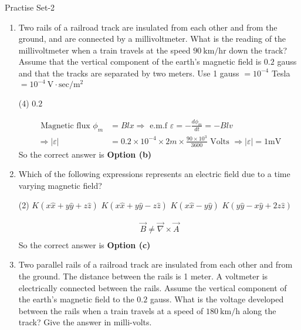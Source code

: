 \newpage
\begin{abox}
	Practise Set-2
\end{abox}
\begin{enumerate}
	\item Two rails of a railroad track are insulated from each other and from the ground, and are connected by a millivoltmeter. What is the reading of the millivoltmeter when a train travels at the speed $90 \mathrm{~km} / \mathrm{hr}$ down the track? Assume that the vertical component of the earth's magnetic field is $0.2$ gauss and that the tracks are separated by two meters. Use 1 gauss $=10^{-4}$ Tesla $=10^{-4} \mathrm{~V} \cdot \mathrm{sec} / \mathrm{m}^{2}$
	{}
	\begin{tasks}(4)
		\task[\textbf{c.}]$0.2$
	\end{tasks}
\begin{answer}
	\begin{align*}
	\text { Magnetic flux } \phi_{m}&=B l x \Rightarrow \text { e.m.f } \varepsilon=-\frac{d \phi_{m}}{d t}=-B l v\\
	\Rightarrow|\varepsilon|&=0.2 \times 10^{-4} \times 2 m \times \frac{90 \times 10^{3}}{3600} \text { Volts } \Rightarrow|\varepsilon|=1 \mathrm{mV}
	\end{align*}
		So the correct answer is \textbf{Option (b)}
\end{answer}
	\item 	Which of the following expressions represents an electric field due to a time varying magnetic field?
	{}
	\begin{tasks}(2)
		\task[\textbf{a.}]$K(x \hat{x}+y \hat{y}+z \hat{z})$
		\task[\textbf{b.}] $K(x \hat{x}+y \hat{y}-z \hat{z})$
		\task[\textbf{c.}]$K(x \hat{x}-y \hat{y})$
		\task[\textbf{d.}]$K(y \hat{y}-x \hat{y}+2 z \hat{z})$ 
	\end{tasks}	
\begin{answer}
	\begin{align*}
	\vec{B} \neq \vec{\nabla} \times \vec{A}\\
	\end{align*}
	So the correct answer is \textbf{Option (c)}
\end{answer}
	\item Two parallel rails of a railroad track are insulated from each other and from the ground. The distance between the rails is 1 meter. A voltmeter is electrically connected between the rails. Assume the vertical component of the earth's magnetic field to the $0.2$ gauss. What is the voltage developed between the rails when a train travels at a speed of $180 \mathrm{~km} / \mathrm{h}$ along the track? Give the answer in milli-volts.

\end{enumerate}
